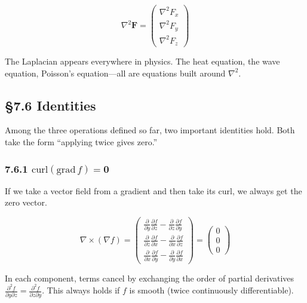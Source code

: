 \documentclass[a4paper,12pt,openany]{book}
\begin{document}
\[\nabla^2 \mathbf{F} = \begin{pmatrix} \nabla^2 F_x \\ \nabla^2 F_y \\ \nabla^2 F_z \end{pmatrix}\]

The Laplacian appears everywhere in physics. The heat equation, the wave
equation, Poisson's equation—all are equations built around
\(\nabla^2\).

\par\vspace{0.35em}\par

\hypertarget{identities}{%
\subsection{§7.6 Identities}\label{identities}}

Among the three operations defined so far, two important identities
hold. Both take the form ``applying twice gives zero.''

\hypertarget{mathrmcurlmathrmgradf-mathbf0}{%
\subsubsection{\texorpdfstring{7.6.1
\(\mathrm{curl}(\mathrm{grad}\,f) = \mathbf{0}\)}{7.6.1 \textbackslash mathrm\{curl\}(\textbackslash mathrm\{grad\}\textbackslash,f) = \textbackslash mathbf\{0\}}}\label{mathrmcurlmathrmgradf-mathbf0}}

If we take a vector field from a gradient and then take its curl, we
always get the zero vector.

\[\nabla \times (\nabla f) = \begin{pmatrix}
\frac{\partial}{\partial y}\frac{\partial f}{\partial z} - \frac{\partial}{\partial z}\frac{\partial f}{\partial y} \\[0.5em]
\frac{\partial}{\partial z}\frac{\partial f}{\partial x} - \frac{\partial}{\partial x}\frac{\partial f}{\partial z} \\[0.5em]
\frac{\partial}{\partial x}\frac{\partial f}{\partial y} - \frac{\partial}{\partial y}\frac{\partial f}{\partial x}
\end{pmatrix} = \begin{pmatrix} 0 \\ 0 \\ 0 \end{pmatrix}\]

In each component, terms cancel by exchanging the order of partial
derivatives
\(\frac{\partial^2 f}{\partial y\partial z} = \frac{\partial^2 f}{\partial z\partial y}\).
This always holds if \(f\) is smooth (twice continuously
differentiable).
\end{document}
